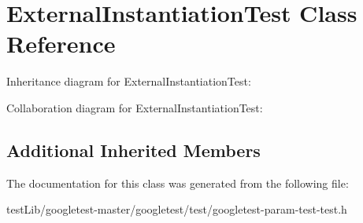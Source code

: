 \hypertarget{classExternalInstantiationTest}{}\section{External\+Instantiation\+Test Class Reference}
\label{classExternalInstantiationTest}


Inheritance diagram for External\+Instantiation\+Test\+:


Collaboration diagram for External\+Instantiation\+Test\+:
\subsection*{Additional Inherited Members}


The documentation for this class was generated from the following file\+:\begin{DoxyCompactItemize}
\item 
test\+Lib/googletest-\/master/googletest/test/googletest-\/param-\/test-\/test.\+h\end{DoxyCompactItemize}
